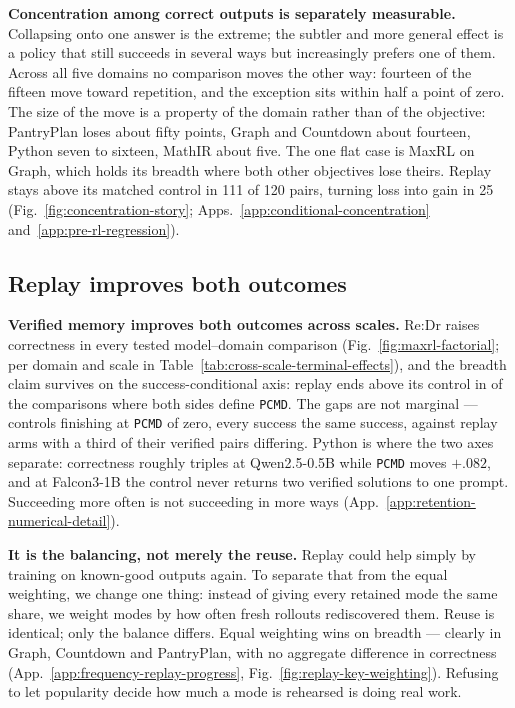\documentclass{article}
\newcommand{\1}{\mathbf 1}
\newcommand{\pmd}{\texttt{PCMD}}
\theoremstyle{remark}
\theoremstyle{definition}
\theoremstyle{plain}
\begin{document}
\textbf{Concentration among correct outputs is separately measurable.}
Collapsing onto one answer is the extreme; the subtler and more general effect
is a policy that still succeeds in several ways but increasingly prefers one of
them. Across all five domains no comparison moves the other way: fourteen of the
fifteen move toward repetition, and the exception sits within half a point of
zero. The size of the move is a property of the domain rather than of the
objective: PantryPlan loses about fifty points, Graph and Countdown about
fourteen, Python seven to sixteen, MathIR about five. The one flat case is
MaxRL on Graph, which holds its breadth where both other objectives lose
theirs.
Replay stays above its matched control in 111 of 120 pairs, turning loss into
gain in 25
(Fig.~\ref{fig:concentration-story}; Apps.~\ref{app:conditional-concentration}
and~\ref{app:pre-rl-regression}).


\subsection{Replay improves both outcomes}
\label{sec:results-retention}

\textbf{Verified memory improves both outcomes across scales.}
Re:Dr raises correctness in every tested model--domain comparison
(Fig.~\ref{fig:maxrl-factorial}; per domain and scale in
Table~\ref{tab:cross-scale-terminal-effects}), and the breadth claim survives
on the success-conditional axis: replay ends above its control in \PMDabove{}
of the \PMDblocks{} comparisons where both sides define \pmd{}. The gaps are
not marginal --- controls finishing at \pmd{} of zero, every success the same
success, against replay arms with a third of their verified pairs differing.
Python is where the two axes separate: correctness roughly triples at
Qwen2.5-0.5B while \pmd{} moves $+.082$, and at Falcon3-1B the control never
returns two verified solutions to one prompt.
Succeeding more often is not succeeding in more ways
(App.~\ref{app:retention-numerical-detail}).

\textbf{It is the balancing, not merely the reuse.}
Replay could help simply by training on known-good outputs again. To separate
that from the equal weighting, we change one thing: instead of giving every
retained mode the same share, we weight modes by how often fresh rollouts
rediscovered them. Reuse is identical; only the balance differs. Equal
weighting wins on breadth --- clearly in Graph, Countdown and PantryPlan, with
no aggregate difference in correctness
(App.~\ref{app:frequency-replay-progress},
Fig.~\ref{fig:replay-key-weighting}). Refusing to let popularity decide how
much a mode is rehearsed is doing real work.
\end{document}
